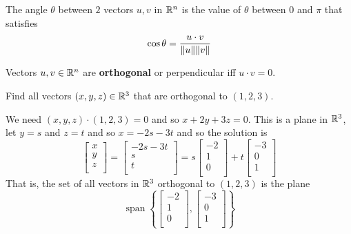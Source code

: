 \documentclass{article}
\DeclareMathOperator{\spn}{span}
\begin{document}
\begin{definition}
  The angle $\theta$ between $2$ vectors $u, v$ in $\mathbb{R}^n$ is the value of $\theta$ between $0$ and $\pi$ that satisfies \[
    \cos \theta = \frac{u\cdot v}{\norm{u}\norm{v}}
  \]
\end{definition}
\begin{definition}
  Vectors $u, v \in \mathbb{R}^n$ are \textbf{orthogonal} or perpendicular iff $u \cdot v = 0$.
\end{definition}
\begin{example}
  Find all vectors $(x, y, z) \in \mathbb{R}^3$ that are orthogonal to $(1, 2, 3)$.

  We need $(x, y, z) \cdot (1, 2, 3) = 0$ and so $x + 2y + 3z = 0$.
  This is a plane in $\mathbb{R}^3$, let $y = s$ and $z = t$ and so $x = -2s - 3t$ and so the solution is \[
    \begin{bmatrix}
      x \\y\\z\\
    \end{bmatrix} =
    \begin{bmatrix}
      -2s - 3t \\
      s        \\t\\
    \end{bmatrix} = s
    \begin{bmatrix}
      -2 \\1\\0\\
    \end{bmatrix} + t
    \begin{bmatrix}
      -3 \\0\\1\\
    \end{bmatrix}
  \]
  That is, the set of all vectors in $\mathbb{R}^3$ orthogonal to $(1, 2, 3)$ is the plane \[
    \spn\left\{
    \begin{bmatrix}
      -2 \\1\\0\\
    \end{bmatrix},
    \begin{bmatrix}
      -3 \\0\\1\\
    \end{bmatrix}\right\}
  \]
\end{example}
\end{document}
